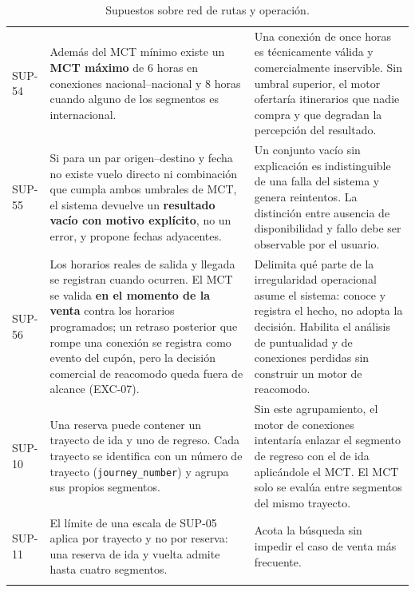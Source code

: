 \documentclass[10pt,letterpaper]{article}
\begin{document}
\begin{longtable}{@{}L{1.7cm} L{7.4cm} L{6.1cm}@{}}
SUP-54 & Además del MCT mínimo existe un \textbf{MCT máximo} de 6 horas en conexiones nacional--nacional y 8 horas cuando alguno de los segmentos es internacional. & Una conexión de once horas es técnicamente válida y comercialmente inservible. Sin umbral superior, el motor ofertaría itinerarios que nadie compra y que degradan la percepción del resultado. \\
SUP-55 & Si para un par origen--destino y fecha no existe vuelo directo ni combinación que cumpla ambos umbrales de MCT, el sistema devuelve un \textbf{resultado vacío con motivo explícito}, no un error, y propone fechas adyacentes. & Un conjunto vacío sin explicación es indistinguible de una falla del sistema y genera reintentos. La distinción entre ausencia de disponibilidad y fallo debe ser observable por el usuario. \\
SUP-56 & Los horarios reales de salida y llegada se registran cuando ocurren. El MCT se valida \textbf{en el momento de la venta} contra los horarios programados; un retraso posterior que rompe una conexión se registra como evento del cupón, pero la decisión comercial de reacomodo queda fuera de alcance (EXC-07). & Delimita qué parte de la irregularidad operacional asume el sistema: conoce y registra el hecho, no adopta la decisión. Habilita el análisis de puntualidad y de conexiones perdidas sin construir un motor de reacomodo. \\
SUP-10 & Una reserva puede contener un trayecto de ida y uno de regreso. Cada trayecto se identifica con un número de trayecto (\texttt{journey\_number}) y agrupa sus propios segmentos. & Sin este agrupamiento, el motor de conexiones intentaría enlazar el segmento de regreso con el de ida aplicándole el MCT. El MCT solo se evalúa entre segmentos del mismo trayecto. \\
SUP-11 & El límite de una escala de SUP-05 aplica por trayecto y no por reserva: una reserva de ida y vuelta admite hasta cuatro segmentos. & Acota la búsqueda sin impedir el caso de venta más frecuente. \\
\bottomrule
\caption{Supuestos sobre red de rutas y operación.}
\end{longtable}
\end{document}
